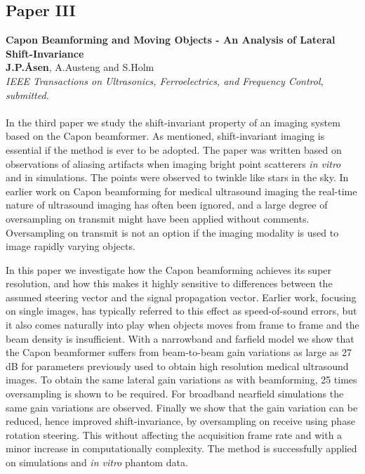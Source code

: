 \subsection{Paper III}
\textbf{Capon Beamforming and Moving Objects - An Analysis of Lateral Shift-Invariance}\\
\textbf{J.\:P.\:\AA{}sen}, A.\:Austeng and S.\:Holm\\
{\it IEEE Transactions on Ultrasonics, Ferroelectrics, and Frequency Control, submitted.}\\\\
In the third paper we study the shift-invariant property of an imaging system based on the Capon beamformer. As mentioned, shift-invariant imaging is essential if the method is ever to be adopted. The paper was written based on observations of aliasing artifacts when imaging bright point scatterers \textit{in vitro} and in simulations. The points were observed to twinkle like stars in the sky. In earlier work on Capon beamforming for medical ultrasound imaging the real-time nature of ultrasound imaging has often been ignored, and a large degree of oversampling on transmit might have been applied without comments. Oversampling on transmit is not an option if the imaging modality is used to image rapidly varying objects.

In this paper we investigate how the Capon beamforming achieves its super resolution, and how this makes it highly sensitive to differences between the assumed steering vector and the signal propagation vector. Earlier work, focusing on single images, has typically referred to this effect as speed-of-sound errors, but it also comes naturally into play when objects moves from frame to frame and the beam density is insufficient. With a narrowband and farfield model we show that the Capon beamformer suffers from beam-to-beam gain variations as large as 27 dB for parameters previously used to obtain high resolution medical ultrasound images.  To obtain the same lateral gain variations as with  beamforming, 25 times oversampling is shown to be required. For broadband nearfield simulations the same gain variations are observed. Finally we show that the gain variation can be reduced, hence improved shift-invariance, by oversampling on receive using phase rotation steering. This without affecting the acquisition frame rate and with a minor increase in computationally complexity. The method is successfully applied on simulations and \textit{in vitro} phantom data.

